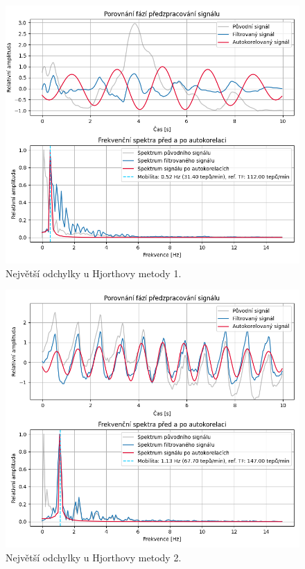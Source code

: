 \begin{figure}[!ht]
	\centering
	\includegraphics[width=1\textwidth]{./obrazky/diskuze/err_hjorth_but_1.png}
	\caption[Největší odchylky u Hjorthovy metody 1 - BUT PPG]{Největší odchylky u Hjorthovy metody 1.}
	\label{fig:BUT_hjorth_err_1}
\end{figure}

\begin{figure}[!ht]
	\centering
	\includegraphics[width=1\textwidth]{./obrazky/diskuze/err_hjorth_but_2.png}
	\caption[Největší odchylky u Hjorthovy metody 2 - BUT PPG]{Největší odchylky u Hjorthovy metody 2.}
	\label{fig:BUT_hjorth_err_2}
\end{figure}

